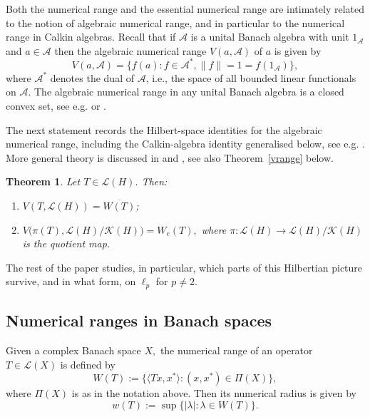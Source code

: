 \documentclass[11pt]{amsart}
\numberwithin{equation}{section}
\newtheorem{theorem}{Theorem}[section]
\theoremstyle{definition}
\theoremstyle{remark}
\DeclareMathOperator{\conv}{conv}
\def\cA{\mathcal A}
\newcommand{\ip}[2]{\langle #1,#2\rangle}
\begin{document}
Both the numerical range and the essential numerical range are intimately related to the notion of algebraic numerical range, and in particular to the numerical range in Calkin algebras. Recall that if $\cA$ is a unital Banach algebra with unit $1_\cA$ and $a\in\cA$ then the algebraic numerical range $V(a,\cA)$ of $a$ is given by
$$
V(a,\cA)=\{f(a):f\in\cA^*, \|f\|=1=f(1_\cA)\},
$$
where $\cA^*$ denotes the dual of $\cA$, i.e., the space of all bounded linear functionals on $\cA$. The algebraic numerical range in any unital Banach algebra is a closed convex set, see e.g. \cite[Chapter~1.2]{BD1} or \cite[Chapter~4.1]{GW}.

The next statement records the Hilbert-space identities for the algebraic
numerical range, including the Calkin-algebra identity generalised below, see e.g.
\cite[Chapters~4.1 and 4.2]{GW}. More general theory is discussed in
\cite[Chapter~3, \S9]{BD1} and \cite[Chapter~7, \S34]{BD2}, see also
Theorem~\ref{vrange} below. 

\begin{theorem}\label{vrangeh}
Let $T\in \mathcal L(H)$. Then:
\begin{enumerate}[label=\textup{(\roman*)}]
\item $V(T,\mathcal L(H))=\overline{W(T)}$;
\item  $V\bigl(\pi(T),\mathcal L(H)/\mathcal K(H)\bigr)=W_e(T),$
where \(\pi:\mathcal L(H)\to\mathcal L(H)/\mathcal K(H)\) is the quotient map.
\end{enumerate}
\end{theorem}



The rest of the paper studies, in particular, which parts of this Hilbertian picture survive, and in what form, on $\ell_p$ for $p\neq2$.


\subsection{Numerical ranges in Banach spaces}\label{Banachtheory}

Given a complex Banach space $X,$ the numerical range of an operator $T\in \mathcal L(X)$ is defined by
\begin{equation}\label{eq:banach-spatial-numerical-range}
W(T):=\{\ip{Tx}{x^*}: (x,x^*)\in\Pi(X)\},
\end{equation}
where $\Pi(X)$ is as in the notation above.
Then its numerical radius is given by
\[
w(T):=\sup\{|\lambda|: \lambda\in W(T)\}.
\]
\end{document}
